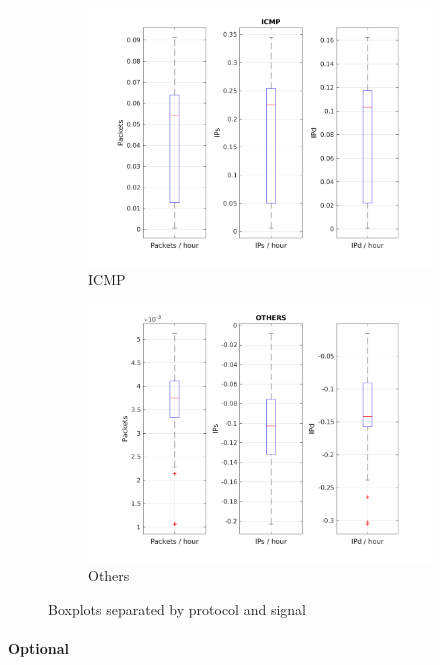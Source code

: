 \documentclass{article}
\begin{document}
\begin{figure}[h]
\begin{subfigure}{.5\textwidth}
        \includegraphics[width=\textwidth]{../exercise-3/plots/rep_17_ICMP}
        \caption{ICMP}
    \end{subfigure}
    \begin{subfigure}{.5\textwidth}
        \centering
        \includegraphics[width=\textwidth]{../exercise-3/plots/rep_17_OTHERS}
        \caption{Others}
    \end{subfigure}
    \caption{\label{figure:rep-17} Boxplots separated by protocol and signal}
\end{figure}

\paragraph{Optional}
\end{document}
